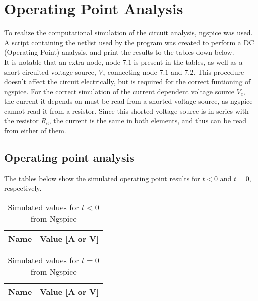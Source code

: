 \section{Operating Point Analysis}
\label{sec:simulation}

To realize the computational simulation of the circuit analysis, ngspice was used. A script containing the netlist used by the program was created to perform a DC (Operating Point) analysis, and print the results to the tables down below.\\ 
It is notable that an extra node, node $7.1$ is present in the tables, as well as a short circuited voltage source, $V_{e}$ connecting node $7.1$ and $7.2$. This procedure doesn't affect the circuit electrically, but is required for the correct funtioning of ngspice. For the correct simulation of the current dependent voltage source $V_{c}$, the current it depends on must be read from a shorted voltage source, as ngspice cannot read it from a resistor. Since this shorted voltage source is in series with the resistor $R_{6}$, the current is the same in both elements, and thus can be read from either of them.\\ 

\subsection{Operating point analysis} 

The tables below show the simulated operating point results for $t<0$ and $t=0$, respectively. 
\FloatBarrier
\begin{table}[h]
  \centering
  \begin{tabular}{|l|r|}
    \hline    
    {\bf Name} & {\bf Value [A or V]} \\ \hline
    
  \end{tabular}
  \caption{Simulated values for $t<0$ from Ngspice}
  \label{tab:op}
\end{table}
\FloatBarrier

\FloatBarrier
\begin{table}[h]
  \centering
  \begin{tabular}{|l|r|}
    \hline    
    {\bf Name} & {\bf Value [A or V]} \\ \hline
    
  \end{tabular}
  \caption{Simulated values for $t=0$ from Ngspice}
  \label{tab:op}
\end{table}
\FloatBarrier


\vspace{10cm}

